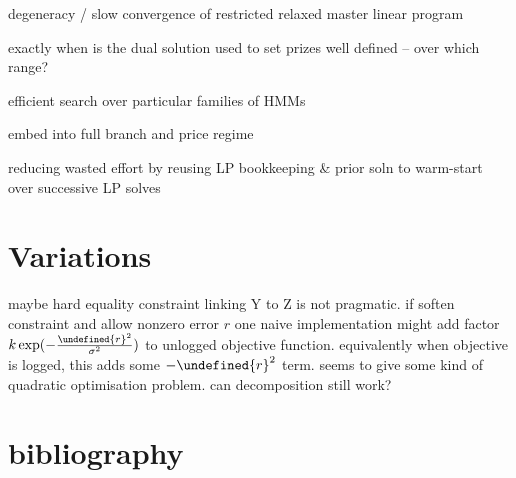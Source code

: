 \documentclass[twoside, 11pt]{article}
\let\norm\undefined
\DeclarePairedDelimiter\norm{\lVert}{\rVert}
\begin{document}
{degeneracy / slow convergence of restricted relaxed master linear program}

{exactly when is the dual solution used to set prizes well defined -- over which range?}

{efficient search over particular families of HMMs}

{embed into full branch and price regime}

{reducing wasted effort by reusing LP bookkeeping & prior soln to warm-start over successive LP solves}

\section{Variations}

{maybe hard equality constraint linking Y to Z is not pragmatic. if soften constraint and allow nonzero error $r$ one naive implementation might add factor $k \exp(-\frac{\norm{r}^2}{{\sigma^2}})$ to unlogged objective function. equivalently when objective is logged, this adds some $- \norm{r}^2$ term. seems to give some kind of quadratic optimisation problem. can decomposition still work?}

\section{bibliography}
\end{document}
